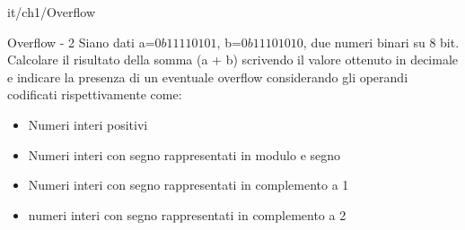 \documentclass[11pt]{article}
\begin{document}
\begin{quiz}{it/ch1/Overflow}
\begin{cloze}[points=1,shuffle=false]{Overflow - 2}
Siano dati a=$0b11110101$, b=$0b11101010$, due numeri binari su 8 bit.
Calcolare il risultato della somma (a + b) scrivendo il valore ottenuto in decimale e indicare la presenza di un eventuale overflow considerando gli operandi codificati rispettivamente come:
\begin{itemize}
    \item Numeri interi positivi
    \item Numeri interi con segno rappresentati in modulo e segno
    \item Numeri interi con segno rappresentati in complemento a 1
    \item numeri interi con segno rappresentati in complemento a 2
\end{itemize}
\end{cloze}


\end{quiz}
\end{document}
